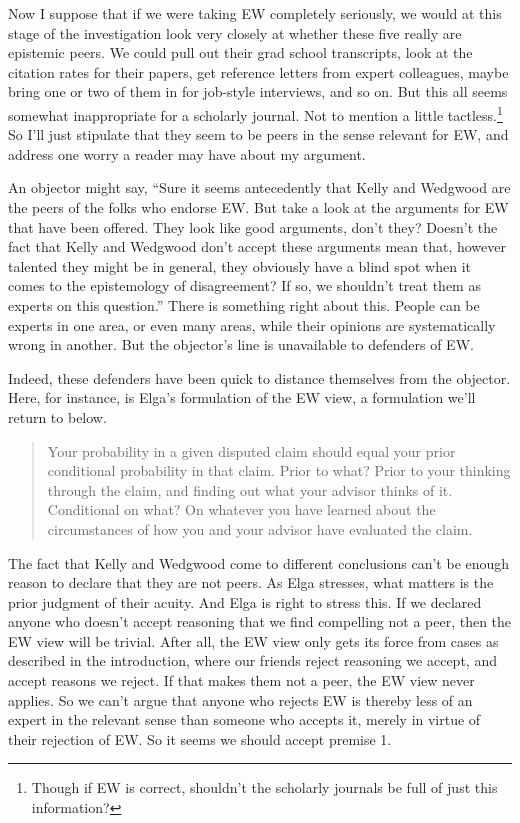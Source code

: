 Now I suppose that if we were taking EW completely seriously, we would at this stage of the investigation look very closely at whether these five really are epistemic peers. We could pull out their grad school transcripts, look at the citation rates for their papers, get reference letters from expert colleagues, maybe bring one or two of them in for job-style interviews, and so on. But this all seems somewhat inappropriate for a scholarly journal. Not to mention a little tactless.\footnote{Though if EW is correct, shouldn't the scholarly journals be full of just this information?}  So I'll just stipulate that they seem to be peers in the sense relevant for EW, and address one worry a reader may have about my argument.

An objector might say, ``Sure it seems antecedently that Kelly and Wedgwood are the peers of the folks who endorse EW. But take a look at the arguments for EW that have been offered. They look like good arguments, don't they? Doesn't the fact that Kelly and Wedgwood don't accept these arguments mean that, however talented they might be in general, they obviously have a blind spot when it comes to the epistemology of disagreement? If so, we shouldn't treat them as experts on this question.'' There is something right about this. People can be experts in one area, or even many areas, while their opinions are systematically wrong in another. But the objector's line is unavailable to defenders of EW.

Indeed, these defenders have been quick to distance themselves from the objector. Here, for instance, is Elga's formulation of the EW view, a formulation we'll return to below.

\begin{quote}Your probability in a given disputed claim should equal your prior conditional probability in that claim. Prior to what? Prior to your thinking through the claim, and finding out what your advisor thinks of it. Conditional on what? On whatever you have learned about the circumstances of how you and your advisor have evaluated the claim. \cite[490]{Elga2007-ELGRAD}
\end{quote}

The fact that Kelly and Wedgwood come to different conclusions can't be enough reason to declare that they are not peers. As Elga stresses, what matters is the prior judgment of their acuity. And Elga is right to stress this. If we declared anyone who doesn't accept reasoning that we find compelling not a peer, then the EW view will be trivial. After all, the EW view only gets its force from cases as described in the introduction, where our friends reject reasoning we accept, and accept reasons we reject. If that makes them not a peer, the EW view never applies. So we can't argue that anyone who rejects EW is thereby less of an expert in the relevant sense than someone who accepts it, merely in virtue of their rejection of EW. So it seems we should accept premise 1.

